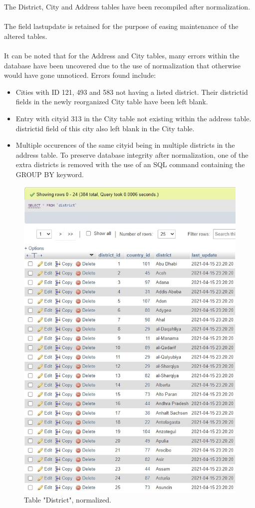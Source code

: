 \documentclass{article}
\begin{document}
		The District, City and Address tables have been recompiled after normalization. \\\\
		The field last\textunderscore update is retained for the purpose of easing maintenance of the altered tables. \\\\
		It can be noted that for the Address and City tables, many errors within the database have been uncovered due to the use of normalization that otherwise would have gone unnoticed.  Errors found include: 
		\begin{itemize}
			\item Cities with ID 121, 493 and 583 not having a listed district. Their district\textunderscore id fields in the newly reorganized City table have been left blank.
			\item Entry with city\textunderscore id 313 in the City table not existing within the address table. district\textunderscore id field of this city also left blank in the City table.
			\item Multiple occurences of the same city\textunderscore id being in multiple districts in the address table. To preserve database integrity after normalization, one of the extra districts is removed with the use of an SQL command containing the GROUP BY keyword. 
		\end{itemize}
		\begin{figure}[H]
			\includegraphics[width=\textwidth]{table_district_norm}
			\caption{Table "District", normalized.}
		\end{figure}
\end{document}
